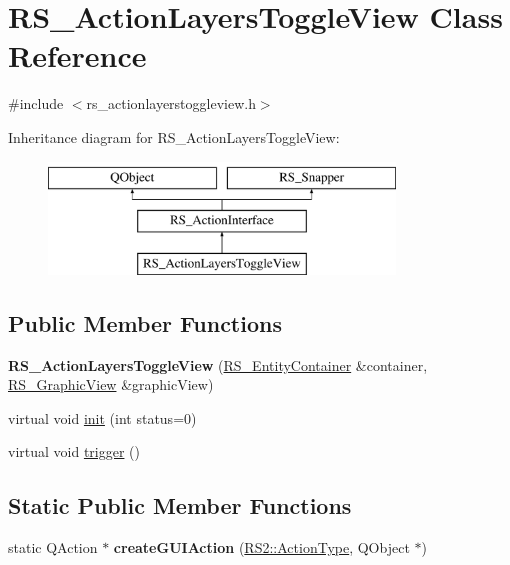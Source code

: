\hypertarget{classRS__ActionLayersToggleView}{\section{R\-S\-\_\-\-Action\-Layers\-Toggle\-View Class Reference}
\label{classRS__ActionLayersToggleView}
}


{\ttfamily \#include $<$rs\-\_\-actionlayerstoggleview.\-h$>$}

Inheritance diagram for R\-S\-\_\-\-Action\-Layers\-Toggle\-View\-:\begin{figure}[H]
\begin{center}
\leavevmode
\includegraphics[height=3.000000cm]{classRS__ActionLayersToggleView}
\end{center}
\end{figure}
\subsection*{Public Member Functions}
\begin{DoxyCompactItemize}
\item 
\hypertarget{classRS__ActionLayersToggleView_ad1aed2cc39e0519193037206df1b2073}{{\bfseries R\-S\-\_\-\-Action\-Layers\-Toggle\-View} (\hyperlink{classRS__EntityContainer}{R\-S\-\_\-\-Entity\-Container} \&container, \hyperlink{classRS__GraphicView}{R\-S\-\_\-\-Graphic\-View} \&graphic\-View)}\label{classRS__ActionLayersToggleView_ad1aed2cc39e0519193037206df1b2073}

\item 
virtual void \hyperlink{classRS__ActionLayersToggleView_a836ac530f75b63a243e357c1a87e1b81}{init} (int status=0)
\item 
virtual void \hyperlink{classRS__ActionLayersToggleView_a3892ee8b016c999f11b31dc1eb5bc2a1}{trigger} ()
\end{DoxyCompactItemize}
\subsection*{Static Public Member Functions}
\begin{DoxyCompactItemize}
\item 
\hypertarget{classRS__ActionLayersToggleView_af0d44f0e3d69d96163d77b983941cdcc}{static Q\-Action $\ast$ {\bfseries create\-G\-U\-I\-Action} (\hyperlink{classRS2_afe3523e0bc41fd637b892321cfc4b9d7}{R\-S2\-::\-Action\-Type}, Q\-Object $\ast$)}\label{classRS__ActionLayersToggleView_af0d44f0e3d69d96163d77b983941cdcc}

\end{DoxyCompactItemize}
